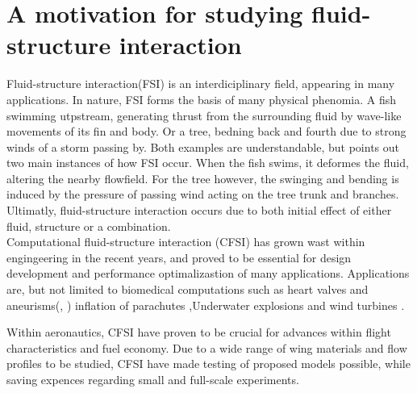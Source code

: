 \chapter{A motivation for studying fluid-structure interaction}
Fluid-structure interaction(FSI) is an interdiciplinary field, appearing in many applications. In nature, FSI forms the basis of many physical phenomia. A fish swimming utpstream,
generating thrust from the surrounding fluid by wave-like movements of its fin and body. Or a tree, bedning back and fourth due to strong winds of a storm passing by. Both examples are understandable, but points out two main instances of how FSI occur. When the fish swims, it deformes the fluid, altering the nearby flowfield. For the tree however, the swinging and bending is induced by the pressure of passing wind acting on the tree trunk and branches. Ultimatly, fluid-structure interaction occurs due to both initial effect of either fluid, structure or a combination.  \\

\newpage
Computational fluid-structure interaction (CFSI) has grown wast within engingeering in the recent years, and proved to be essential for design development and performance optimalizastion of many applications. Applications are, but not limited to biomedical computations such as heart valves and aneurisms(\cite{Torii2008}, \cite{Vierendeels2007}) inflation of parachutes \cite{Stein2001} ,Underwater explosions \cite{Kim2008} and wind turbines \cite{Hsu2012}.

Within aeronautics, CFSI have proven to be crucial for advances within flight characteristics and fuel economy. Due to a wide range of  wing materials and flow profiles to be studied, CFSI have made testing of proposed models possible, while saving expences regarding small and full-scale experiments. \newline

